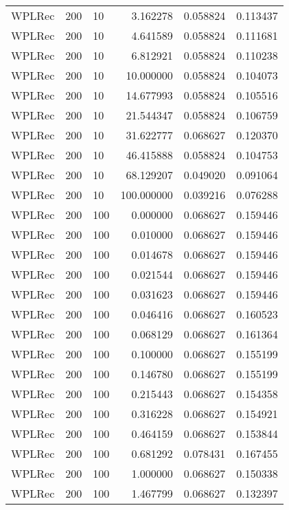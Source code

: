 \begin{tabular}{lllrrr}
 WPLRec &  200 &     10 &    3.162278 &     0.058824 &  0.113437 \\
 WPLRec &  200 &     10 &    4.641589 &     0.058824 &  0.111681 \\
 WPLRec &  200 &     10 &    6.812921 &     0.058824 &  0.110238 \\
 WPLRec &  200 &     10 &   10.000000 &     0.058824 &  0.104073 \\
 WPLRec &  200 &     10 &   14.677993 &     0.058824 &  0.105516 \\
 WPLRec &  200 &     10 &   21.544347 &     0.058824 &  0.106759 \\
 WPLRec &  200 &     10 &   31.622777 &     0.068627 &  0.120370 \\
 WPLRec &  200 &     10 &   46.415888 &     0.058824 &  0.104753 \\
 WPLRec &  200 &     10 &   68.129207 &     0.049020 &  0.091064 \\
 WPLRec &  200 &     10 &  100.000000 &     0.039216 &  0.076288 \\
 WPLRec &  200 &    100 &    0.000000 &     0.068627 &  0.159446 \\
 WPLRec &  200 &    100 &    0.010000 &     0.068627 &  0.159446 \\
 WPLRec &  200 &    100 &    0.014678 &     0.068627 &  0.159446 \\
 WPLRec &  200 &    100 &    0.021544 &     0.068627 &  0.159446 \\
 WPLRec &  200 &    100 &    0.031623 &     0.068627 &  0.159446 \\
 WPLRec &  200 &    100 &    0.046416 &     0.068627 &  0.160523 \\
 WPLRec &  200 &    100 &    0.068129 &     0.068627 &  0.161364 \\
 WPLRec &  200 &    100 &    0.100000 &     0.068627 &  0.155199 \\
 WPLRec &  200 &    100 &    0.146780 &     0.068627 &  0.155199 \\
 WPLRec &  200 &    100 &    0.215443 &     0.068627 &  0.154358 \\
 WPLRec &  200 &    100 &    0.316228 &     0.068627 &  0.154921 \\
 WPLRec &  200 &    100 &    0.464159 &     0.068627 &  0.153844 \\
 WPLRec &  200 &    100 &    0.681292 &     0.078431 &  0.167455 \\
 WPLRec &  200 &    100 &    1.000000 &     0.068627 &  0.150338 \\
 WPLRec &  200 &    100 &    1.467799 &     0.068627 &  0.132397 \\

\end{tabular}
